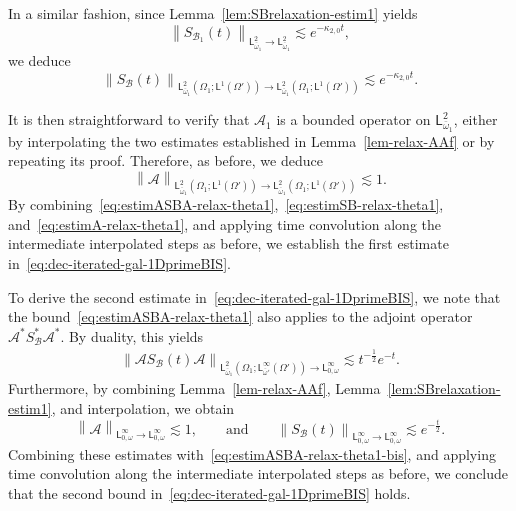\documentclass[11pt]{amsart}
\theoremstyle{definition}
\theoremstyle{remark}
\numberwithin{equation}{section}
\def\AA{{\mathcal A}}
\def\BB{{\mathcal B}}
\newcommand{\sfL}{\mathsf{L}}
\begin{document}
In a similar fashion, since Lemma~\ref{lem:SBrelaxation-estim1} yields
\begin{equation*}
  \left\| S_{\BB_1}(t) \right\|_{\sfL^2_{\bar \omega_1} \to \sfL^2_{\bar \omega_1}} \lesssim e^{-\kappa_{2,0} t},
\end{equation*}
we deduce
\begin{equation}
  \label{eq:estimSB-relax-theta1}
  \left\| S_\BB(t) \right\|_{\sfL^{2}_{\bar \omega_1}(\Omega_1 ; \sfL^{1}(\Omega')) \to \sfL^{2}_{\bar \omega_1}(\Omega_1 ; \sfL^{1}(\Omega'))} \lesssim e^{-\kappa_{2,0} t}.
\end{equation}
 
It is then straightforward to verify that $\AA_1$ is a bounded operator on $\sfL^2_{\bar \omega_1}$, either by interpolating the two estimates established in Lemma~\ref{lem-relax-AAf} or by repeating its proof. Therefore, as before, we deduce
\begin{equation}
  \label{eq:estimA-relax-theta1}
  \left\| \AA \right\|_{\sfL^{2}_{\bar \omega_1}(\Omega_1 ; \sfL^{1}(\Omega')) \to \sfL^{2}_{\bar \omega_1}(\Omega_1 ; \sfL^{1}(\Omega'))} \lesssim 1.
\end{equation}
By combining~\eqref{eq:estimASBA-relax-theta1},~\eqref{eq:estimSB-relax-theta1}, and~\eqref{eq:estimA-relax-theta1}, and applying time convolution along the intermediate interpolated steps as before, we establish the first estimate in~\eqref{eq:dec-iterated-gal-1DprimeBIS}.

\smallskip
To derive the second estimate in~\eqref{eq:dec-iterated-gal-1DprimeBIS}, we note that the bound~\eqref{eq:estimASBA-relax-theta1} also applies to the adjoint operator $\AA^* S_\BB^* \AA^*$. By duality, this yields
\begin{align}
  \label{eq:estimASBA-relax-theta1-bis}
  \left\| \AA S_\BB(t) \AA \right\|_{\sfL^{2}_{\bar \omega_1}(\Omega_1; \sfL^{\infty}_{\bar \omega'}(\Omega')) \to \sfL^{\infty}_{0,\omega}} \lesssim t^{-\frac{1}{2}} e^{-t}.
\end{align}
Furthermore, by combining Lemma~\ref{lem-relax-AAf}, Lemma~\ref{lem:SBrelaxation-estim1}, and interpolation, we obtain
\begin{equation*}
  \left\| \AA \right\|_{\sfL^{\infty}_{0,\omega} \to \sfL^{\infty}_{0,\omega}} \lesssim 1, \qquad \text{and} \qquad \left\| S_\BB(t) \right\|_{\sfL^{\infty}_{0,\omega} \to \sfL^{\infty}_{0,\omega}} \lesssim e^{-\frac{t}{2}}.
\end{equation*}
Combining these estimates with~\eqref{eq:estimASBA-relax-theta1-bis}, and applying time convolution along the intermediate interpolated steps as before, we conclude that the second bound in~\eqref{eq:dec-iterated-gal-1DprimeBIS} holds.
\end{document}
